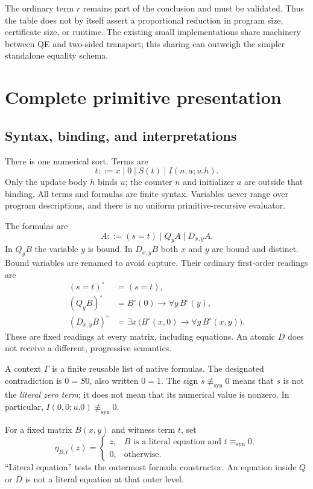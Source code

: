 \documentclass[11pt]{article}
\theoremstyle{definition}\newtheorem{definition}[theorem]{Definition}
\theoremstyle{remark}\newtheorem{remark}[theorem]{Remark}
\newcommand{\lit}{\equiv_{\mathrm{syn}}}
\newcommand{\nolit}{\not\equiv_{\mathrm{syn}}}
\begin{document}
The ordinary term $r$ remains part of the conclusion and must be
validated. Thus the table does not by itself assert a proportional
reduction in program size, certificate size, or runtime. The existing small implementations share machinery
between QE and two-sided transport; this sharing can outweigh the simpler
standalone equality schema.

\section{Complete primitive presentation}

\subsection{Syntax, binding, and interpretations}

There is one numerical sort. Terms are
\[
 t ::= x\mid0\mid S(t)\mid I(n,a;u.h).
\]
Only the update body $h$ binds $u$; the counter $n$ and initializer $a$
are outside that binding. All terms and formulas are finite syntax.
Variables never range over program descriptions, and there is no uniform
primitive-recursive evaluator.

The formulas are
\[
 A ::= (s=t)\mid Q_yA\mid D_{x,y}A.
\]
In $Q_yB$ the variable $y$ is bound. In $D_{x,y}B$ both $x$ and $y$
are bound and distinct. Bound variables are renamed to avoid capture.
Their ordinary first-order readings are
\begin{align*}
 (s=t)^\circ&=(s=t),\\
 (Q_yB)^\circ&=B^\circ(0)\to\forall y\,B^\circ(y),\\
 (D_{x,y}B)^\circ&=\exists x\,
      \bigl(B^\circ(x,0)\to\forall y\,B^\circ(x,y)\bigr).
\end{align*}
These are fixed readings at every matrix, including equations. An atomic
$D$ does not receive a different, progressive semantics.

A context $\Gamma$ is a finite reusable list of native formulas.
The designated contradiction is $0=S0$, also written $0=1$.
The sign $s\nolit0$ means that $s$ is not the \emph{literal zero term};
it does not mean that its numerical value is nonzero. In particular,
$I(0,0;u.0)\nolit0$.

For a fixed matrix $B(x,y)$ and witness term $t$, set
\[
 \eta_{B,t}(z)=
 \begin{cases}
 z,&B\text{ is a literal equation and }t\lit0,\\
 0,&\text{otherwise}.
 \end{cases}
 \tag{Start}\label{eq:start}
\]
``Literal equation'' tests the outermost formula constructor. An equation
inside $Q$ or $D$ is not a literal equation at that outer level.
\end{document}
